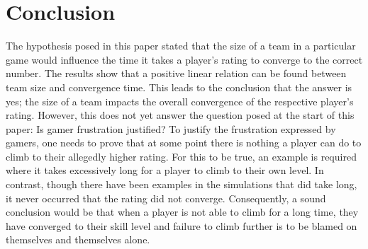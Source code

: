 \documentclass[12pt]{article}
\newcounter{lastnote}
\begin{document}
\section{Conclusion}

The hypothesis posed in this paper stated that the size of a team in a particular game would influence the time it takes a player's rating to converge to the correct number. The results show that a positive linear relation can be found between team size and convergence time. This leads to the conclusion that the answer is yes; the size of a team impacts the overall convergence of the respective player's rating.
However, this does not yet answer the question posed at the start of this paper: Is gamer frustration justified? To justify the frustration expressed by gamers, one needs to prove that at some point there is nothing a player can do to climb to their allegedly higher rating.
For this to be true, an example is required where it takes excessively long for a player to climb to their own level. In contrast, though there have been examples in the simulations that did take long, it never occurred that the rating did not converge. Consequently, a sound conclusion would be that when a player is not able to climb for a long time, they have converged to their skill level and failure to climb further is to be blamed on themselves and themselves alone.


























\end{document}
